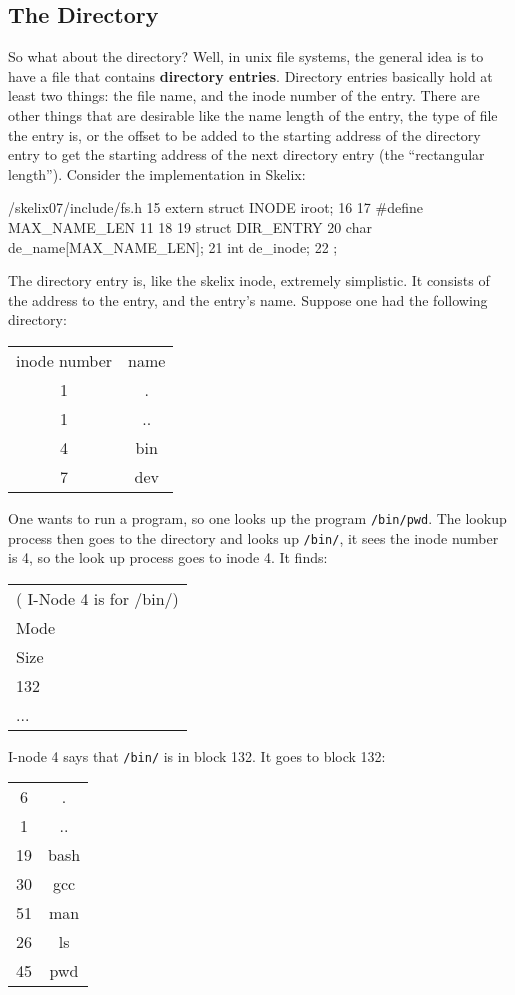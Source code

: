 \documentclass{article}
\begin{document}
\subsection{The Directory}

So what about the directory? Well, in unix file systems, the general idea is to have a file that contains \textbf{directory entries}. Directory entries basically hold at least two things: 
the file name, 
and the inode number of the entry. 
There are other things that are desirable like the name length of the entry, the type of file the entry is, or the offset to be added to the starting address of the directory entry to get the starting address of the next directory entry (the ``rectangular length''). Consider the implementation in Skelix:


\begin{code}{/skelix07/include/fs.h}
15 extern struct INODE iroot;
16 
17 #define MAX_NAME_LEN 11
18 
19 struct DIR_ENTRY {
20      char de_name[MAX_NAME_LEN];
21      int de_inode;
22 };
\end{code}
The directory entry is, like the skelix inode, extremely simplistic. It consists of the address to the entry, and the entry's name. Suppose one had the following directory:

\begin{tabular}{cc}
 \textrm{inode number} & \textrm{name} \\
 1  & . \\
 1 & .. \\
 4 & \textrm{bin} \\
 7 & \textrm{dev} 
\end{tabular}

One wants to run a program, so one looks up the program \verb|/bin/pwd|. The lookup process then goes to the directory and looks up \verb|/bin/|, it sees the inode number is 4, so the look up process goes to inode 4. It finds:

\begin{tabular}{l} \\
(\textrm{ I-Node 4 is for /bin/}) \\
\textrm{Mode} \\
\textrm{Size} \\
132 \\
...
\end{tabular}

I-node 4 says that \verb|/bin/| is in block 132. It goes to block 132:

\begin{tabular}{cc}
 6 & . \\
 1 & .. \\
 19 & \textrm{bash} \\
 30 & \textrm{gcc} \\
 51 & \textrm{man} \\
 26 & \textrm{ls} \\
 45 & \textrm{pwd} 
\end{tabular}
\end{document}
